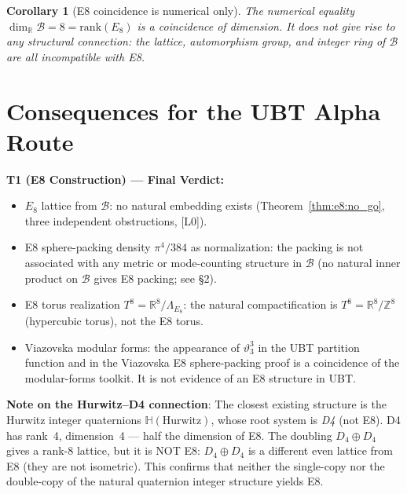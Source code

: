 \documentclass[12pt,a4paper]{article}
\newtheorem{corollary}[theorem]{Corollary}
\theoremstyle{definition}
\theoremstyle{remark}
\begin{document}
\begin{corollary}[E8 coincidence is numerical only]
\label{cor:e8:coincidence}
The numerical equality $\dim_{\mathbb{R}}\mathcal{B} = 8 = \mathrm{rank}(E_8)$
is a coincidence of dimension.  It does not give rise to any structural connection:
the lattice, automorphism group, and integer ring of $\mathcal{B}$ are all
incompatible with E8.
\end{corollary}

\section{Consequences for the UBT Alpha Route}
\label{sec:e8:consequences}

\begin{resultbox}
\textbf{T1 (E8 Construction) — Final Verdict:}
\begin{itemize}
  \item[\textbf{DISPROVED}] $E_8$ lattice from $\mathcal{B}$: no natural embedding exists
        (Theorem~\ref{thm:e8:no_go}, three independent obstructions, [L0]).
  \item[\textbf{DISPROVED}] E8 sphere-packing density $\pi^4/384$ as normalization:
        the packing is not associated with any metric or mode-counting structure in
        $\mathcal{B}$ (no natural inner product on $\mathcal{B}$ gives E8 packing; see §2).
  \item[\textbf{DISPROVED}] E8 torus realization $T^8 = \mathbb{R}^8/\Lambda_{E_8}$:
        the natural compactification is $T^8 = \mathbb{R}^8/\mathbb{Z}^8$
        (hypercubic torus), not the E8 torus.
  \item[\textbf{ANALOGY ONLY}] Viazovska modular forms: the appearance of
        $\vartheta_3^3$ in the UBT partition function and in the Viazovska E8
        sphere-packing proof is a coincidence of the modular-forms toolkit.
        It is not evidence of an E8 structure in UBT.
\end{itemize}
\end{resultbox}

\begin{warnbox}
\textbf{Note on the Hurwitz–D4 connection}:
The closest existing structure is the Hurwitz integer quaternions
$\mathbb{H}(\mathrm{Hurwitz})$, whose root system is \emph{D4} (not E8).
D4 has rank~4, dimension~4 — half the dimension of E8.
The doubling $D_4 \oplus D_4$ gives a rank-8 lattice, but it is NOT E8:
$D_4 \oplus D_4$ is a different even lattice from E8 (they are not isometric).
This confirms that neither the single-copy nor the double-copy of the natural
quaternion integer structure yields E8.
\end{warnbox}
\end{document}
